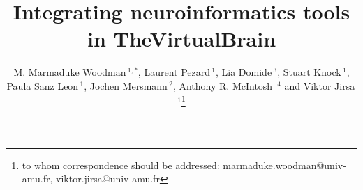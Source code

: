 \documentclass{bioinfo}
\begin{document}


\title[TVB]{Integrating neuroinformatics tools in TheVirtualBrain}
\author[Woodman {et~al}]{
        M. Marmaduke Woodman\,$^{1,*}$,  
        Laurent Pezard\,$^{1}$,  
        Lia Domide\,$^{3}$, 
        Stuart Knock\,$^{1}$, 
        Paula Sanz Leon\,$^{1}$, 
        Jochen Mersmann\,$^{2}$,
        Anthony R. McIntosh \,$^{4}$ and  
        Viktor Jirsa\,$^{1}$\footnote{to whom correspondence should be addressed: marmaduke.woodman@univ-amu.fr,
        viktor.jirsa@univ-amu.fr}}

\address{$^{1}$ \texttt{NEED CORRECT AFFILIATION FOR AIX-MARSEILLE UNIVERSITY, Marseille, France.}\\
         $^{3}$ Codemart, 13, Petofi Sandor, 400610, Cluj-Napoca, Romania.\\
         $^{2}$ CodeBox GmbH, Hugo Eckener Str. 7, 70184 Stuttgart, Germany.\\
         $^{4}$ Rotman Research Institute at Baycrest, Toronto, M6A 2E1, Ontario, Canada\\
        }

\history{}

\editor{}

\maketitle

\end{document}
